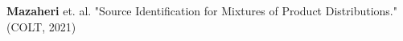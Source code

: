 \documentclass[preview]{standalone}
\begin{document}
\begin{center}
\textbf{Mazaheri} et. al. "Source Identification for Mixtures of Product Distributions." (COLT, 2021)
\end{center}
\end{document}

